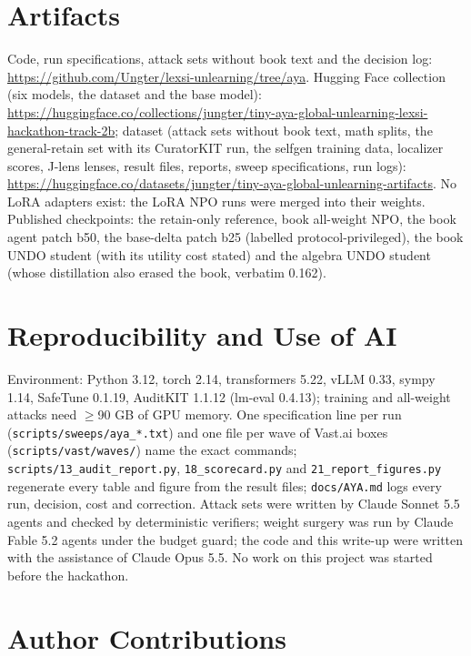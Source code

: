 \documentclass[10pt,twocolumn,letterpaper]{article}
\begin{document}
\section*{Artifacts}

Code, run specifications, attack sets without book text and the decision log:
\url{https://github.com/Ungter/lexsi-unlearning/tree/aya}. Hugging Face collection (six models, the dataset and the
base model): \url{https://huggingface.co/collections/jungter/tiny-aya-global-unlearning-lexsi-hackathon-track-2b};
dataset (attack sets without book text, math splits, the general-retain set with its CuratorKIT run, the selfgen
training data, localizer scores, J-lens lenses, result files, reports, sweep specifications, run logs):
\url{https://huggingface.co/datasets/jungter/tiny-aya-global-unlearning-artifacts}. No LoRA adapters exist: the LoRA
NPO runs were merged into their weights.
Published checkpoints: the retain-only reference, book all-weight NPO, the book agent patch b50, the base-delta patch b25
(labelled protocol-privileged), the book UNDO student (with its utility cost stated) and the algebra UNDO student (whose
distillation also erased the book, verbatim 0.162).

\section*{Reproducibility and Use of AI}

Environment: Python 3.12, torch 2.14, transformers 5.22, vLLM 0.33, sympy 1.14, SafeTune 0.1.19, AuditKIT 1.1.12
(lm-eval 0.4.13); training and all-weight attacks need $\ge$90 GB of GPU memory. One specification line per run
(\texttt{scripts/sweeps/aya\_*.txt}) and one file per wave of Vast.ai boxes (\texttt{scripts/vast/waves/}) name the exact
commands; \texttt{scripts/13\_audit\_report.py}, \texttt{18\_scorecard.py} and \texttt{21\_report\_figures.py} regenerate
every table and figure from the result files; \texttt{docs/AYA.md} logs every run, decision, cost and correction. Attack sets were
written by Claude Sonnet 5.5 agents and checked by deterministic verifiers; weight surgery was run by Claude Fable 5.2
agents under the budget guard; the code and this write-up were written with the assistance of Claude Opus 5.5. No work
on this project was started before the hackathon.

\section*{Author Contributions}
\end{document}
